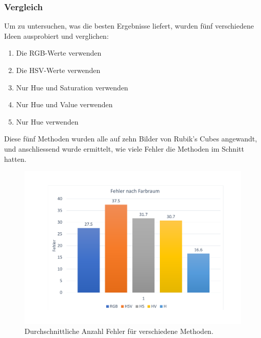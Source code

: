 \documentclass[a4paper, 12pt]{article}
\begin{document}
\subsubsection{Vergleich}
Um zu untersuchen, was die besten Ergebnisse liefert, wurden fünf verschiedene Ideen ausprobiert und verglichen:
\begin{enumerate}
  \item Die RGB-Werte verwenden
  \item Die HSV-Werte verwenden
  \item Nur Hue und Saturation verwenden
  \item Nur Hue und Value verwenden
  \item Nur Hue verwenden
\end{enumerate}
Diese fünf Methoden wurden alle auf zehn Bilder von Rubik's Cubes angewandt, und anschliessend wurde ermittelt, wie viele Fehler die Methoden im Schnitt hatten. 
\begin{figure}[H]
\includegraphics[scale=0.4]{Fehler_nach_Methode}
\caption{Durchschnittliche Anzahl Fehler für verschiedene Methoden.}
\end{figure}
\end{document}
